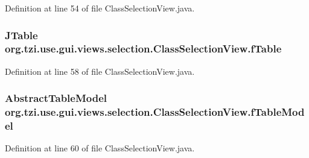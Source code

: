 Definition at line 54 of file Class\-Selection\-View.\-java.

\hypertarget{classorg_1_1tzi_1_1use_1_1gui_1_1views_1_1selection_1_1_class_selection_view_a0375d7ea744660b952ddd76cb4b29796}{
\subsubsection[{f\-Table}]{\setlength{\rightskip}{0pt plus 5cm}J\-Table org.\-tzi.\-use.\-gui.\-views.\-selection.\-Class\-Selection\-View.\-f\-Table\hspace{0.3cm}{\ttfamily [protected]}}}\label{classorg_1_1tzi_1_1use_1_1gui_1_1views_1_1selection_1_1_class_selection_view_a0375d7ea744660b952ddd76cb4b29796}


Definition at line 58 of file Class\-Selection\-View.\-java.

\hypertarget{classorg_1_1tzi_1_1use_1_1gui_1_1views_1_1selection_1_1_class_selection_view_a41911dbd4b64166538a7c8ea78406194}{
\subsubsection[{f\-Table\-Model}]{\setlength{\rightskip}{0pt plus 5cm}Abstract\-Table\-Model org.\-tzi.\-use.\-gui.\-views.\-selection.\-Class\-Selection\-View.\-f\-Table\-Model\hspace{0.3cm}{\ttfamily [protected]}}}\label{classorg_1_1tzi_1_1use_1_1gui_1_1views_1_1selection_1_1_class_selection_view_a41911dbd4b64166538a7c8ea78406194}


Definition at line 60 of file Class\-Selection\-View.\-java.

